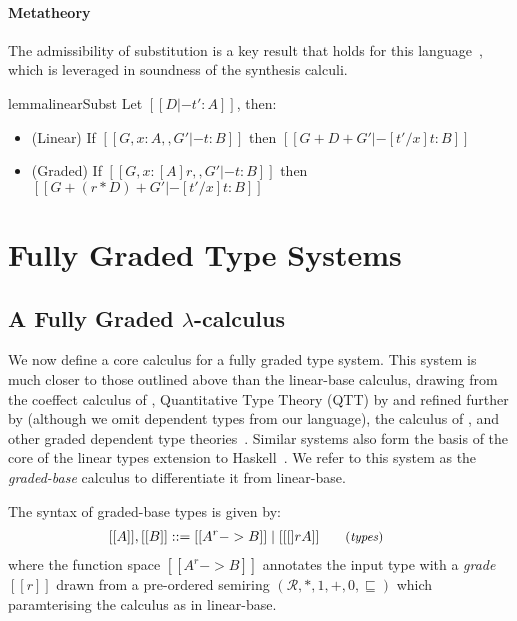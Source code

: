 \paragraph{Metatheory}
The admissibility of substitution is a key result that holds
for this language~\cite{DBLP:journals/pacmpl/OrchardLE19}, which is
leveraged in soundness of the synthesis calculi.
%
\begin{restatable}{lemma}{linearSubst}
Let $[[ D |- t' : A]]$, then:
\label{lemma:substitution}
\begin{itemize}[leftmargin=1em]
\item (Linear) \hspace{0.04em} If $[[ {G, x : A}
    ,, { G' } |- t : B]]$ then $[[ G + D + G' |-
[ t' / x ] t : B ]]$
\item (Graded) If $[[ {G, x : [A] r} ,, { G' } |- t : B]]$
then $[[ G + (r * D) + G' |- [ t' / x ] t : B ]]$
\end{itemize}
\end{restatable}

\section{Fully Graded Type Systems}


\subsection{A Fully Graded $\lambda$-calculus}
\label{sec:graded-base}

We now define a core calculus for a fully graded type system. This system is
much closer to those outlined above than the linear-base calculus, drawing from
the coeffect calculus of \citet{petricek2014coeffects}, Quantitative Type Theory
(QTT) by \citet{McBride2016} and refined further by
\citet{quantitative-type-theory} (although we omit dependent types from our
language), the calculus of \citet{DBLP:journals/pacmpl/AbelB20}, and other
graded dependent type
theories~\cite{quantitative-type-theory,DBLP:conf/esop/MoonEO21}. Similar
systems also form the basis of the core of the linear types extension to
Haskell~\cite{DBLP:journals/pacmpl/BernardyBNJS18}. We refer to this system as
the \textit{graded-base} calculus to differentiate it from linear-base.

The syntax of graded-base types is given by:
\begin{align*}
\hspace{-0.9em}[[ A ]] , [[ B ]] & ::=
       [[ A ^ r -> B ]]
  \mid [[ [] r A ]]
{\small{\tag{\textit{types}}}}
\end{align*}
where the function space $[[ A ^ r -> B ]]$ annotates the input type with a \emph{grade} $[[ r ]]$
drawn from a pre-ordered semiring
$(\mathcal{R}, {\ast}, {1}, {+}, {0}, \sqsubseteq)$ which paramterising the
calculus as in linear-base.

